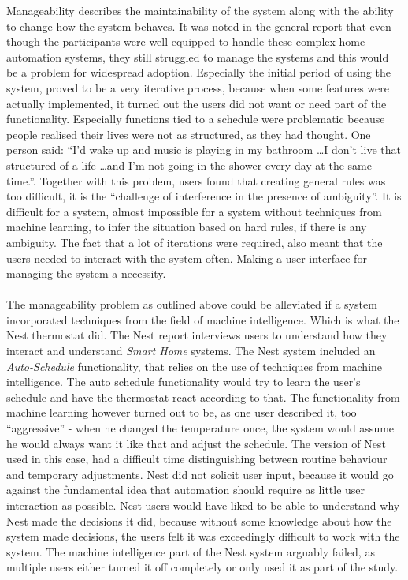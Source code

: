 Manageability describes the maintainability of the system along with the ability
to change how the system behaves. It was noted in the general report that even though the participants were well-equipped to handle these complex home automation systems, they still struggled to manage the systems and this would be a problem for widespread adoption. Especially the initial period of using the system, proved to be a very iterative process, because when some features were actually implemented, it turned out the users did not want or need part of the functionality. Especially functions tied to a schedule were problematic because people realised their lives were not as structured, as they had thought. One person said: \enquote{I'd wake up and music is playing in my bathroom \ldots I don't live that structured of a life \ldots and I'm not going in the shower every day at the same time.}. Together with this problem, users found that creating general rules was too difficult, it is the \enquote{challenge of interference in the presence of ambiguity}\cite{HAInterviews}. It is difficult for a system, almost impossible for a system without techniques from machine learning, to infer the situation based on hard rules, if there is any ambiguity. The fact that a lot of iterations were required, also meant that the users needed to interact with the system often. Making a user interface for managing the system a necessity.
\\\\
The manageability problem as outlined above could be alleviated if a system incorporated techniques from the field of machine intelligence. Which is what the Nest thermostat did. The Nest report interviews users to understand how they interact and understand \emph{Smart Home} systems. The Nest system included an \emph{Auto-Schedule} functionality, that relies on the use of techniques from machine intelligence. The auto schedule functionality would try to learn the user's schedule and have the thermostat react according to that. The functionality from machine learning however turned out to be, as one user described it, too \enquote{aggressive}\cite{AdaptiveInterviews} - when he changed the temperature once, the system would assume he would always want it like that and adjust the schedule. The version of Nest used in this case, had a difficult time distinguishing between routine behaviour and temporary adjustments. Nest did not solicit user input, because it would go against the fundamental idea that automation should require as little user interaction as possible. Nest users would have liked to be able to understand why Nest made the decisions it did, because without some knowledge about how the system made decisions, the users felt it was exceedingly difficult to work with the system. The machine intelligence part of the Nest system arguably failed, as multiple users either turned it off completely or only used it as part of the study.

